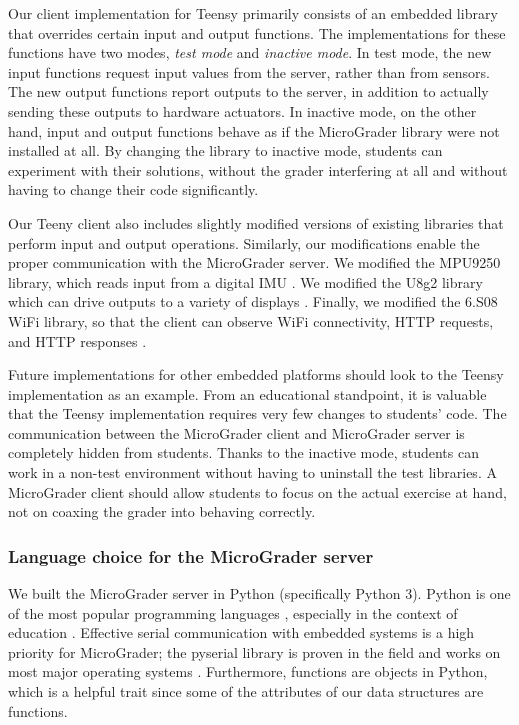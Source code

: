 \documentclass[12pt]{article}
\begin{document}
Our client implementation for Teensy primarily consists of an embedded library that overrides certain input and output functions.  The implementations for these functions have two modes, \textit{test mode} and \textit{inactive mode}.  In test mode, the new input functions request input values from the server, rather than from sensors.  The new output functions report outputs to the server, in addition to actually sending these outputs to hardware actuators.  In inactive mode, on the other hand, input and output functions behave as if the MicroGrader library were not installed at all.  By changing the library to inactive mode, students can experiment with their solutions, without the grader interfering at all and without having to change their code significantly. 

Our Teeny client also includes slightly modified versions of existing libraries that perform input and output operations.  Similarly, our modifications enable the proper communication with the MicroGrader server.  We modified the MPU9250 library, which reads input from a digital IMU \cite{MPU9250}.  We modified the U8g2 library which can drive outputs to a variety of displays \cite{u8g2}.  Finally, we modified the 6.S08 WiFi library, so that the client can observe WiFi connectivity, HTTP requests, and HTTP responses \cite{6s08-wifi}.

Future implementations for other embedded platforms should look to the Teensy implementation as an example.  From an educational standpoint, it is valuable that the Teensy implementation requires very few changes to students' code.  The communication between the MicroGrader client and MicroGrader server is completely hidden from students.  Thanks to the inactive mode, students can work in a non-test environment without having to uninstall the test libraries.  A MicroGrader client should allow students to focus on the actual exercise at hand, not on coaxing the grader into behaving correctly.

\subsubsection{Language choice for the MicroGrader server}
We built the MicroGrader server in Python (specifically Python 3).  Python is one of the most popular programming languages \cite{python-popular}, especially in the context of education \cite{python-ed}.  Effective serial communication with embedded systems is a high priority for MicroGrader; the pyserial library is proven in the field and works on most major operating systems \cite{pyserial}. Furthermore, functions are objects in Python, which is a helpful trait since some of the attributes of our data structures are functions.  
\end{document}
